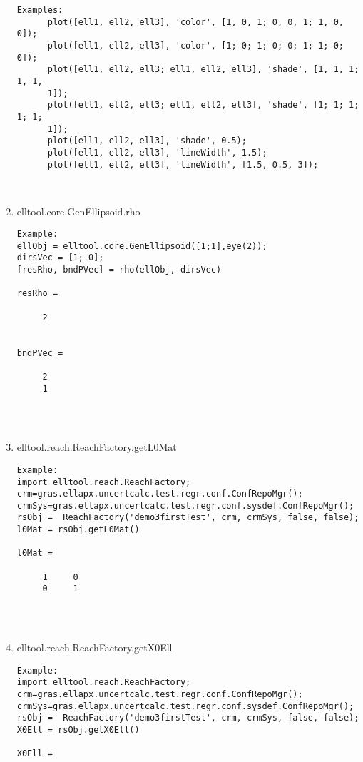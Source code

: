 \begin{enumerate}
\begin{lstlisting}
Examples:
      plot([ell1, ell2, ell3], 'color', [1, 0, 1; 0, 0, 1; 1, 0, 0]);
      plot([ell1, ell2, ell3], 'color', [1; 0; 1; 0; 0; 1; 1; 0; 0]);
      plot([ell1, ell2, ell3; ell1, ell2, ell3], 'shade', [1, 1, 1; 1, 1,
      1]);
      plot([ell1, ell2, ell3; ell1, ell2, ell3], 'shade', [1; 1; 1; 1; 1;
      1]);
      plot([ell1, ell2, ell3], 'shade', 0.5);
      plot([ell1, ell2, ell3], 'lineWidth', 1.5);
      plot([ell1, ell2, ell3], 'lineWidth', [1.5, 0.5, 3]);



\end{lstlisting}
\fontfamily{\familydefault}
\selectfont
\item {elltool.core.GenEllipsoid.rho}
\selectfont
\begin{lstlisting}
Example:
ellObj = elltool.core.GenEllipsoid([1;1],eye(2));
dirsVec = [1; 0];
[resRho, bndPVec] = rho(ellObj, dirsVec)

resRho =

     2


bndPVec =

     2
     1




\end{lstlisting}
\fontfamily{\familydefault}
\selectfont
\item {elltool.reach.ReachFactory.getL0Mat}
\selectfont
\begin{lstlisting}
Example:
import elltool.reach.ReachFactory;
crm=gras.ellapx.uncertcalc.test.regr.conf.ConfRepoMgr();
crmSys=gras.ellapx.uncertcalc.test.regr.conf.sysdef.ConfRepoMgr();
rsObj =  ReachFactory('demo3firstTest', crm, crmSys, false, false);
l0Mat = rsObj.getL0Mat()

l0Mat =

     1     0
     0     1




\end{lstlisting}
\fontfamily{\familydefault}
\selectfont
\item {elltool.reach.ReachFactory.getX0Ell}
\selectfont
\begin{lstlisting}
Example:
import elltool.reach.ReachFactory;
crm=gras.ellapx.uncertcalc.test.regr.conf.ConfRepoMgr();
crmSys=gras.ellapx.uncertcalc.test.regr.conf.sysdef.ConfRepoMgr();
rsObj =  ReachFactory('demo3firstTest', crm, crmSys, false, false);
X0Ell = rsObj.getX0Ell()

X0Ell =


\end{lstlisting}
\end{enumerate}
